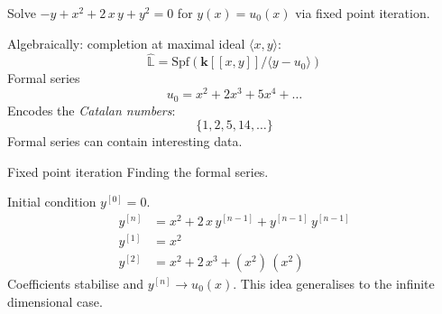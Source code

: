     \begin{frame}
    Solve \(-y + x^2 + 2\, x\, y + y^2 = 0\) for \(y(x)=u_0(x)\) via fixed point iteration. 
    
    Algebraically: completion at maximal ideal \( \langle x, y \rangle \):
    \[ \widehat{\mathbb{L}} = \mathrm{Spf} \left( \mathbf{k}[\![x,y ]\!]/ \langle y - u_0 \rangle \right) \]
    Formal series
    \[ u_0 = x^2 + 2 x^3 + 5 x^4 + \dots \]
    Encodes the \emph{Catalan numbers}:
    \[ \{1,2,5,14,\dots \}\]
    Formal series can contain interesting data. 
    \end{frame}
    
    \begin{frame}{Fixed point iteration}
        Finding the formal series.
        
        Initial condition \(y^{[0]} = 0\).
        \begin{align*} 
        y^{[n]} &= x^2 + 2 \,x\, y^{[n-1]} + y^{[n-1]}\, y^{[n-1]} \\
        y^{[1]} &= x^2 \\
        y^{[2]} &= x^2 + 2 \, x^3 + (x^2)\, (x^2) 
        \end{align*}
        Coefficients stabilise and \(y^{[n]} \rightarrow u_0(x)\). This idea generalises to the infinite dimensional case.
    \end{frame}
    
